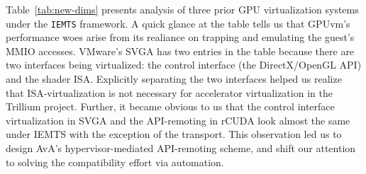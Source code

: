 \begin{table*}[tt!]
\centering
\footnotesize
{}
\caption{Comparing virtualization designs using the \texttt{IEMTS} framework.}
\label{tab:new-dims}
\end{table*}

Table~\ref{tab:new-dims} presents analysis of three prior GPU virtualization
systems under the \texttt{IEMTS} framework. A quick glance at the table
tells us that GPUvm's~\cite{suzuki2014gpuvm} performance woes arise from its
realiance on trapping and emulating the guest's MMIO accesses. VMware's SVGA
has two entries in the table because there are two interfaces being
virtualized: the control interface (the DirectX/OpenGL API) and the shader ISA.
Explicitly separating the two interfaces helped us realize that
ISA-virtualization is not necessary for accelerator virtualization in the
Trillium project. Further, it became obvious to us that the control interface
virtualization in SVGA and the API-remoting in rCUDA look almost the same
under IEMTS with the exception of the transport. This observation led us
to design AvA's hypervisor-mediated API-remoting scheme, and shift our
attention to solving the compatibility effort via automation.